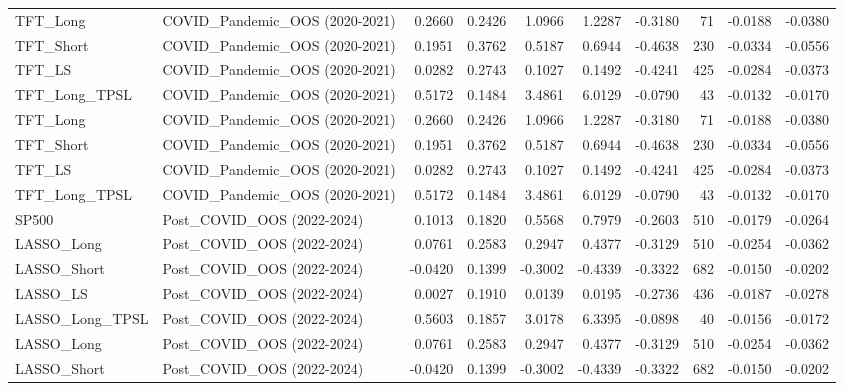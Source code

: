 \begin{tabular}{llrrrrrrrr}
\cline{1-10}
TFT\_Long & COVID\_Pandemic\_OOS (2020-2021) & 0.2660 & 0.2426 & 1.0966 & 1.2287 & -0.3180 & 71 & -0.0188 & -0.0380 \\
\cline{1-10}
TFT\_Short & COVID\_Pandemic\_OOS (2020-2021) & 0.1951 & 0.3762 & 0.5187 & 0.6944 & -0.4638 & 230 & -0.0334 & -0.0556 \\
\cline{1-10}
TFT\_LS & COVID\_Pandemic\_OOS (2020-2021) & 0.0282 & 0.2743 & 0.1027 & 0.1492 & -0.4241 & 425 & -0.0284 & -0.0373 \\
\cline{1-10}
TFT\_Long\_TPSL & COVID\_Pandemic\_OOS (2020-2021) & 0.5172 & 0.1484 & 3.4861 & 6.0129 & -0.0790 & 43 & -0.0132 & -0.0170 \\
\cline{1-10}
TFT\_Long & COVID\_Pandemic\_OOS (2020-2021) & 0.2660 & 0.2426 & 1.0966 & 1.2287 & -0.3180 & 71 & -0.0188 & -0.0380 \\
\cline{1-10}
TFT\_Short & COVID\_Pandemic\_OOS (2020-2021) & 0.1951 & 0.3762 & 0.5187 & 0.6944 & -0.4638 & 230 & -0.0334 & -0.0556 \\
\cline{1-10}
TFT\_LS & COVID\_Pandemic\_OOS (2020-2021) & 0.0282 & 0.2743 & 0.1027 & 0.1492 & -0.4241 & 425 & -0.0284 & -0.0373 \\
\cline{1-10}
TFT\_Long\_TPSL & COVID\_Pandemic\_OOS (2020-2021) & 0.5172 & 0.1484 & 3.4861 & 6.0129 & -0.0790 & 43 & -0.0132 & -0.0170 \\
\cline{1-10}
SP500 & Post\_COVID\_OOS (2022-2024) & 0.1013 & 0.1820 & 0.5568 & 0.7979 & -0.2603 & 510 & -0.0179 & -0.0264 \\
\cline{1-10}
LASSO\_Long & Post\_COVID\_OOS (2022-2024) & 0.0761 & 0.2583 & 0.2947 & 0.4377 & -0.3129 & 510 & -0.0254 & -0.0362 \\
\cline{1-10}
LASSO\_Short & Post\_COVID\_OOS (2022-2024) & -0.0420 & 0.1399 & -0.3002 & -0.4339 & -0.3322 & 682 & -0.0150 & -0.0202 \\
\cline{1-10}
LASSO\_LS & Post\_COVID\_OOS (2022-2024) & 0.0027 & 0.1910 & 0.0139 & 0.0195 & -0.2736 & 436 & -0.0187 & -0.0278 \\
\cline{1-10}
LASSO\_Long\_TPSL & Post\_COVID\_OOS (2022-2024) & 0.5603 & 0.1857 & 3.0178 & 6.3395 & -0.0898 & 40 & -0.0156 & -0.0172 \\
\cline{1-10}
LASSO\_Long & Post\_COVID\_OOS (2022-2024) & 0.0761 & 0.2583 & 0.2947 & 0.4377 & -0.3129 & 510 & -0.0254 & -0.0362 \\
\cline{1-10}
LASSO\_Short & Post\_COVID\_OOS (2022-2024) & -0.0420 & 0.1399 & -0.3002 & -0.4339 & -0.3322 & 682 & -0.0150 & -0.0202 \\
\cline{1-10}

\end{tabular}
